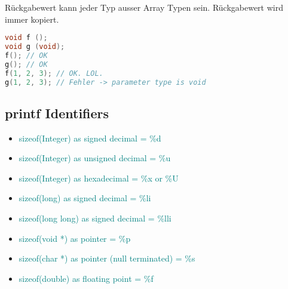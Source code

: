 \begin{multicols*}{4}
Rückgabewert kann jeder Typ ausser Array Typen sein. Rückgabewert wird immer kopiert.

\begin{lstlisting}[language=c]
void f ();
void g (void);
f(); // OK
g(); // OK
f(1, 2, 3); // OK. LOL.
g(1, 2, 3); // Fehler -> parameter type is void
\end{lstlisting}

\subsection{printf Identifiers}
\begin{itemize}
    \item \textcolor{teal}{sizeof(Integer) as signed decimal = \%d}
    \item \textcolor{teal}{sizeof(Integer) as unsigned decimal = \%u}
    \item \textcolor{teal}{sizeof(Integer) as hexadecimal = \%x or \%U}
    \item \textcolor{teal}{sizeof(long) as signed decimal = \%li}
    \item \textcolor{teal}{sizeof(long long) as signed decimal = \%lli}
    \item \textcolor{teal}{sizeof(void *) as pointer = \%p}
    \item \textcolor{teal}{sizeof(char *) as pointer (null terminated) = \%s}
    \item \textcolor{teal}{sizeof(double) as floating point = \%f}
\end{itemize}

\end{multicols*}

